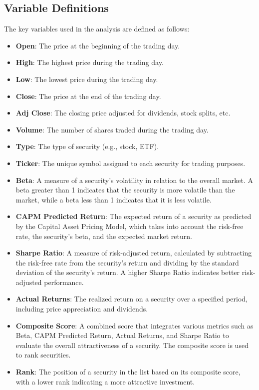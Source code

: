 \subsection{Variable Definitions}
The key variables used in the analysis are defined as follows:
\begin{itemize}
    \item \textbf{Open}: The price at the beginning of the trading day.
    \item \textbf{High}: The highest price during the trading day.
    \item \textbf{Low}: The lowest price during the trading day.
    \item \textbf{Close}: The price at the end of the trading day.
    \item \textbf{Adj Close}: The closing price adjusted for dividends, stock splits, etc.
    \item \textbf{Volume}: The number of shares traded during the trading day.
    \item \textbf{Type}: The type of security (e.g., stock, ETF).
    \item \textbf{Ticker}: The unique symbol assigned to each security for trading purposes.
    \item \textbf{Beta}: A measure of a security's volatility in relation to the overall market. A beta greater than 1 indicates that the security is more volatile than the market, while a beta less than 1 indicates that it is less volatile.
    \item \textbf{CAPM Predicted Return}: The expected return of a security as predicted by the Capital Asset Pricing Model, which takes into account the risk-free rate, the security's beta, and the expected market return.
    \item \textbf{Sharpe Ratio}: A measure of risk-adjusted return, calculated by subtracting the risk-free rate from the security's return and dividing by the standard deviation of the security's return. A higher Sharpe Ratio indicates better risk-adjusted performance.
    \item \textbf{Actual Returns}: The realized return on a security over a specified period, including price appreciation and dividends.
    \item \textbf{Composite Score}: A combined score that integrates various metrics such as Beta, CAPM Predicted Return, Actual Returns, and Sharpe Ratio to evaluate the overall attractiveness of a security. The composite score is used to rank securities.
    \item \textbf{Rank}: The position of a security in the list based on its composite score, with a lower rank indicating a more attractive investment.
\end{itemize}




\newpage
